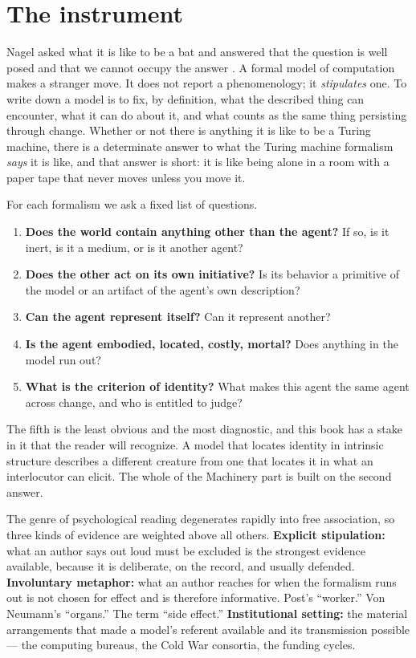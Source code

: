 \section{The instrument}
\label{psy:sec:method}

Nagel asked what it is like to be a bat and answered that the
question is well posed and that we cannot occupy the answer
\cite{nagel1974}.
A formal model of computation makes a stranger move.
It does not report a phenomenology; it \emph{stipulates} one.
To write down a model is to fix, by definition, what the described
thing can encounter, what it can do about it, and what counts as the
same thing persisting through change.
Whether or not there is anything it is like to be a Turing machine,
there is a determinate answer to what the Turing machine formalism
\emph{says} it is like, and that answer is short: it is like being
alone in a room with a paper tape that never moves unless you move
it.

For each formalism we ask a fixed list of questions.

\begin{enumerate}[label=(\roman*),leftmargin=2.2em,itemsep=0.15em]
\item \textbf{Does the world contain anything other than the agent?}
If so, is it inert, is it a medium, or is it another agent?
\item \textbf{Does the other act on its own initiative?} Is its
behavior a primitive of the model or an artifact of the agent's own
description?
\item \textbf{Can the agent represent itself?} Can it represent
another?
\item \textbf{Is the agent embodied, located, costly, mortal?} Does
anything in the model run out?
\item \textbf{What is the criterion of identity?} What makes this
agent the same agent across change, and who is entitled to judge?
\end{enumerate}

The fifth is the least obvious and the most diagnostic, and this
book has a stake in it that the reader will recognize.
A model that locates identity in intrinsic structure describes a
different creature from one that locates it in what an interlocutor
can elicit.
The whole of the Machinery part is built on the second answer.

The genre of psychological reading degenerates rapidly into free
association, so three kinds of evidence are weighted above all
others.
\textbf{Explicit stipulation:} what an author says out loud must be
excluded is the strongest evidence available, because it is
deliberate, on the record, and usually defended.
\textbf{Involuntary metaphor:} what an author reaches for when the
formalism runs out is not chosen for effect and is therefore
informative.
Post's ``worker.'' Von Neumann's ``organs.'' The term ``side
effect.''
\textbf{Institutional setting:} the material arrangements that made
a model's referent available and its transmission possible --- the
computing bureaus, the Cold War consortia, the funding cycles.

